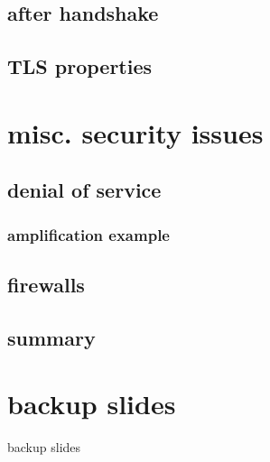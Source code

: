 \subsection{after handshake}


\subsection{TLS properties}


\section{misc. security issues}

\subsection{denial of service}


\subsubsection{amplification example}

\subsection{firewalls} %


\subsection{summary}


\section{backup slides}
\begin{frame}{backup slides}
\end{frame}
